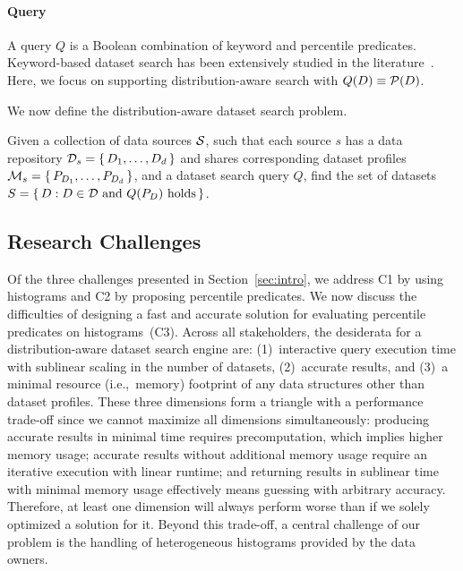 \paragraph{Query}
A query $Q$ is a Boolean combination of keyword and percentile predicates.
Keyword-based dataset search has been extensively studied in the literature~\cite{chapman_dataset_2020, noy_google_2019, wei_survey_2013, zhang_ad_2018}.
Here, we focus on supporting distribution-aware search with $Q(D) \equiv \mathcal{P}(D)$.

We now define the distribution-aware dataset search problem.

\begin{problem}
    Given a collection of data sources $\mathcal{S}$, such that each source $s$ has a data repository $\mathcal{D}_s = \left\{\,D_1,\dots, D_d\,\right\}$ and shares corresponding dataset profiles $\mathcal{M}_s = \left\{\,P_{D_1},\dots, P_{D_d}\,\right\}$, and a dataset search query $Q$, find the set of datasets $S = \left\{\,D: D\in \mathcal{D} \text{ and } Q(P_D)\text{ holds}\,\right\}$.
\end{problem}

\subsection{Research Challenges}
\label{sec:research_challenges}

Of the three challenges presented in Section~\ref{sec:intro}, we address C1 by using histograms and C2 by proposing percentile predicates.
We now discuss the difficulties of designing a fast and accurate solution for evaluating percentile predicates on histograms~(C3).
Across all stakeholders, the desiderata for a distribution-aware dataset search engine are: (1)~interactive query execution time with sublinear scaling in the number of datasets, (2)~accurate results, and (3)~a minimal resource (i.e.,~memory) footprint of any data structures other than dataset profiles.
These three dimensions form a triangle with a performance trade-off since we cannot maximize all dimensions simultaneously: producing accurate results in minimal time requires precomputation, which implies higher memory usage; accurate results without additional memory usage require an iterative execution with linear runtime; and returning results in sublinear time with minimal memory usage effectively means guessing with arbitrary accuracy.
Therefore, at least one dimension will always perform worse than if we solely optimized a solution for it.
Beyond this trade-off, a central challenge of our problem is the handling of heterogeneous histograms provided by the data owners.

